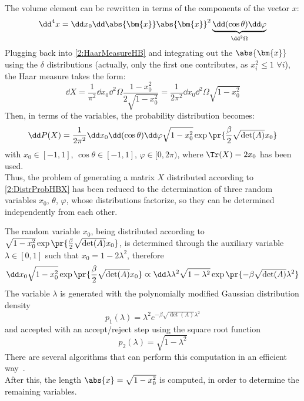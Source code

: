 The volume element can be rewritten in terms of the components of the vector $x$:
\begin{equation}
    \dd^4x = \dd x_0\dd\abs{\bm{x}}\abs{\bm{x}}^2\underbrace{\dd(\cos\theta)\dd\varphi}_{\dd^2\Omega} \label{2:VolumeElemParam}
\end{equation}
Plugging back into \eqref{2:HaarMeasureHB} and integrating out the $\abs{\bm{x}}$ using the $\delta$ distributions (actually, only the first one contributes, as $x_i^2\leq1$ $\forall i$), the Haar measure takes the form:
\begin{equation}
    \dd X = \frac1{\pi^2}\dd x_0\dd^2\Omega\frac{1-x_0^2}{2\sqrt{1-x_0^2}} = \frac1{2\pi^2} \dd x_0 \dd^2\Omega \sqrt{1-x_0^2} \label{2:HaarMeasureHBSimplified}
\end{equation}
Then, in terms of the variables, the probability distribution becomes:
\begin{equation}
    \dd P(X) = \frac1{2\pi^2} \dd x_0 \dd(\cos\theta) \dd\varphi \sqrt{1-x_0^2} \exp\pr{\frac\beta2 \sqrt{\det(A)}x_0} \label{2:DistrProbHBXSimplified}
\end{equation}
with $x_0\in[-1,1]$, $\cos\theta\in[-1,1]$, $\varphi\in[0,2\pi)$, where $\Tr(X)=2x_0$ has been used.\\
Thus, the problem of generating a matrix $X$ distributed according to \eqref{2:DistrProbHBX} has been reduced to the determination of three random variables $x_0$, $\theta$, $\varphi$, whose distributions factorize, so they can be determined independently from each other.

The random variable $x_0$, being distributed according to $\sqrt{1-x_0^2} \exp\pr{\frac\beta2 \sqrt{\det(A)}x_0}$, is determined through the auxiliary variable $\lambda\in[0,1]$ such that $x_0 = 1-2\lambda^2$, therefore
\begin{equation}
    \dd x_0\sqrt{1-x_0^2} \exp\pr{\frac\beta2 \sqrt{\det(A)}x_0} \varpropto \dd\lambda\lambda^2\sqrt{1-\lambda^2} \exp\pr{-\beta \sqrt{\det(A)}\lambda^2} \label{2:LambdaDistrHB}
\end{equation}
The variable $\lambda$ is generated with the polynomially modified Gaussian distribution density
\begin{equation}
    p_1(\lambda) = \lambda^2 e^{-\beta \sqrt{\det(A)}\lambda^2}
\end{equation}
and accepted with an accept/reject step using the square root function
\begin{equation}
    p_2(\lambda) = \sqrt{1-\lambda^2}
\end{equation}
There are several algorithms that can perform this computation in an efficient way~\cite{1998art, luscher1994portable}.\\
After this, the length $\abs{x} = \sqrt{1-x_0^2}$ is computed, in order to determine the remaining variables.

